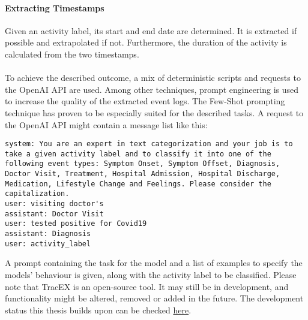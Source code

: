 \paragraph{Extracting Timestamps} Given an activity label, its start and end date are determined. It is extracted if possible and extrapolated if not. Furthermore, the duration of the activity is calculated from the two timestamps.\\\\
To achieve the described outcome, a mix of deterministic scripts and requests to the OpenAI API are used. Among other techniques, prompt engineering is used to increase the quality of the extracted event logs.
The Few-Shot prompting technique has proven to be especially suited for the described tasks. A request to the OpenAI API might contain a message list like this:
\begin{lstlisting}[language=prompt, caption={Few-shot prompt to categorize activities into event types}, label={lst:few-shot}]
system: You are an expert in text categorization and your job is to take a given activity label and to classify it into one of the following event types: Symptom Onset, Symptom Offset, Diagnosis, Doctor Visit, Treatment, Hospital Admission, Hospital Discharge, Medication, Lifestyle Change and Feelings. Please consider the capitalization.  
user: visiting doctor's 
assistant: Doctor Visit  
user: tested positive for Covid19
assistant: Diagnosis
user: activity_label  
\end{lstlisting}
A prompt containing the task for the model and a list of examples to specify the models' behaviour is given, along with the activity label to be classified.
Please note that TracEX is an open-source tool. It may still be in development, and functionality might be altered, removed or added in the future. The development status this thesis builds upon can be checked \href{https://github.com/FR-SON/TracEX}{here}.

